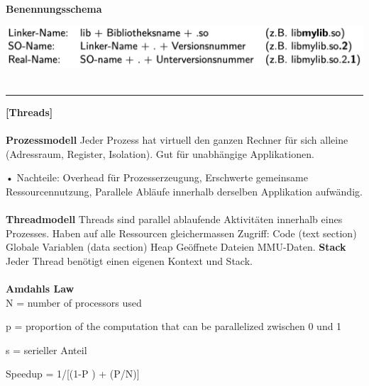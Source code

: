 \documentclass[8pt]{extarticle}
\let\oldtextbf\textbf
\renewcommand{\textbf}{\tiny\oldtextbf}
\begin{document}
\begin{multicols*}{5}
	\textbf{Benennungsschema}
			
	\includegraphics[scale=0.29]{Benennungschema_Shared_Objects.png}\\\\
	\rule{\linewidth}{0.4pt}
	\textbf{[Threads]}\\\\
	\textbf{Prozessmodell} Jeder Prozess hat virtuell den ganzen Rechner für sich alleine (Adressraum, Register, Isolation). Gut für unabhängige Applikationen.
			
	•	Nachteile: Overhead für Prozesserzeugung, Erschwerte gemeinsame Ressourcennutzung, Parallele Abläufe innerhalb derselben Applikation aufwändig.\\\\
	\textbf{Threadmodell} Threads sind parallel ablaufende Aktivitäten innerhalb eines Prozesses. Haben auf alle Ressourcen gleichermassen Zugriff: Code (text section) Globale Variablen (data section) Heap Geöffnete Dateien MMU-Daten.
	\textbf{Stack} Jeder Thread benötigt einen eigenen Kontext und Stack.\\\\
	\textbf{Amdahls Law}\\
	N = number of processors used
				
	p = proportion of the computation that can be parallelized zwischen 0 und 1
				
	s = serieller Anteil
				
	Speedup = 1/[(1-P ) + (P/N)]
	

\end{multicols*}
\end{document}

